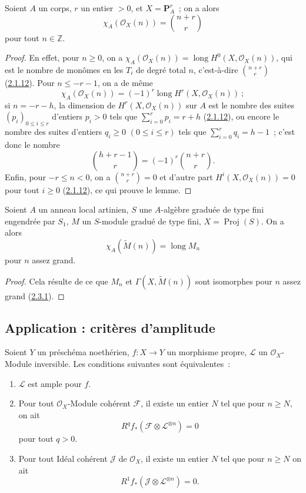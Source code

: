 \begin{lemma}[2.5.3.1]
\label{III.2.5.3.1-fr}
Soient $A$ un corps, $r$ un entier $>0$, et $X=\mathbf P_A^r$~; on a
alors
\[
\chi_A(\mathcal O_X(n))=\binom{n+r}{r}
\]
pour tout $n\in\mathbb Z$.
\end{lemma}

\begin{proof}
En effet, pour $n\geq0$, on a
$\chi_A(\mathcal O_X(n))=\operatorname{long}H^0(X,\mathcal O_X(n))$, qui
est le nombre de monômes en les $T_i$ de degré total $n$, c'est-à-dire
$\binom{n+r}{r}$ (\hyperref[III.2.1.12-fr]{2.1.12}). Pour
$n\leq-r-1$, on a de même
\[
\chi_A(\mathcal O_X(n))=(-1)^r
\operatorname{long}H^r(X,\mathcal O_X(n))~;
\]
si $n=-r-h$, la dimension de $H^r(X,\mathcal O_X(n))$ sur $A$ est le
nombre des suites $(p_i)_{0\leq i\leq r}$ d'entiers $p_i>0$ tels que
$\sum_{i=0}^{r}p_i=r+h$ (\hyperref[III.2.1.12-fr]{2.1.12}), ou encore le
nombre des suites d'entiers $q_i\geq0$ $(0\leq i\leq r)$ tels que
$\sum_{i=0}^{r}q_i=h-1$~; c'est donc le nombre
\[
\binom{h+r-1}{r}=(-1)^r\binom{n+r}{r}.
\]
Enfin, pour $-r\leq n<0$, on a $\binom{n+r}{r}=0$ et d'autre part
$H^i(X,\mathcal O_X(n))=0$ pour tout $i\geq0$
(\hyperref[III.2.1.12-fr]{2.1.12}), ce qui prouve le lemme.
\end{proof}

\begin{corollary}[2.5.4]
\label{III.2.5.4-fr}
Soient $A$ un anneau local artinien, $S$ une $A$-algèbre graduée de type
fini engendrée par $S_1$, $M$ un $S$-module gradué de type fini,
$X=\operatorname{Proj}(S)$. On a alors
\[
\chi_A(\widetilde M(n))=\operatorname{long}M_n
\]
pour $n$ assez grand.
\end{corollary}

\begin{proof}
Cela résulte de ce que $M_n$ et $\Gamma(X,\widetilde M(n))$ sont
isomorphes pour $n$ assez grand
(\hyperref[III.2.3.1-fr]{2.3.1}).
\end{proof}

\subsection{Application : critères d'amplitude}
\label{subsection:III.2.6-fr}

\begin{proposition}[2.6.1]
\label{III.2.6.1-fr}
Soient $Y$ un préschéma noethérien, $f:X\to Y$ un morphisme propre,
$\mathcal L$ un $\mathcal O_X$-Module inversible. Les conditions
suivantes sont équivalentes~:
\begin{enumerate}
\item[a)] $\mathcal L$ est ample pour $f$.
\item[b)] Pour tout $\mathcal O_X$-Module cohérent $\mathcal F$, il
existe un entier $N$ tel que pour $n\geq N$, on ait
\[
R^qf_*(\mathcal F\otimes\mathcal L^{\otimes n})=0
\]
pour tout $q>0$.
\item[c)] Pour tout Idéal cohérent $\mathcal J$ de $\mathcal O_X$, il
existe un entier $N$ tel que pour $n\geq N$ on ait
\[
R^1f_*(\mathcal J\otimes\mathcal L^{\otimes n})=0.
\]
\end{enumerate}
\end{proposition}

